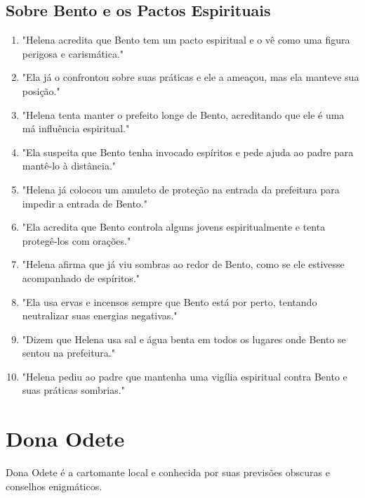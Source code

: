 \subsection*{Sobre Bento e os Pactos Espirituais}
\begin{enumerate}
    \item "Helena acredita que Bento tem um pacto espiritual e o vê como uma figura perigosa e carismática."
    \item "Ela já o confrontou sobre suas práticas e ele a ameaçou, mas ela manteve sua posição."
    \item "Helena tenta manter o prefeito longe de Bento, acreditando que ele é uma má influência espiritual."
    \item "Ela suspeita que Bento tenha invocado espíritos e pede ajuda ao padre para mantê-lo à distância."
    \item "Helena já colocou um amuleto de proteção na entrada da prefeitura para impedir a entrada de Bento."
    \item "Ela acredita que Bento controla alguns jovens espiritualmente e tenta protegê-los com orações."
    \item "Helena afirma que já viu sombras ao redor de Bento, como se ele estivesse acompanhado de espíritos."
    \item "Ela usa ervas e incensos sempre que Bento está por perto, tentando neutralizar suas energias negativas."
    \item "Dizem que Helena usa sal e água benta em todos os lugares onde Bento se sentou na prefeitura."
    \item "Helena pediu ao padre que mantenha uma vigília espiritual contra Bento e suas práticas sombrias."
\end{enumerate}


\section{Dona Odete}
Dona Odete é a cartomante local e conhecida por suas previsões obscuras e conselhos enigmáticos.

